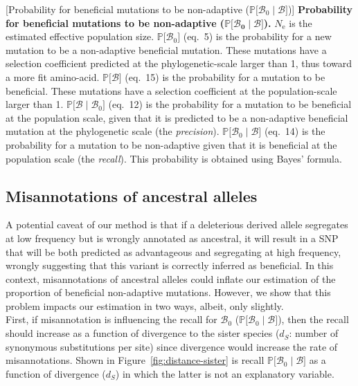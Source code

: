 \documentclass{article}
\newcommand{\Ne}{N_{\text{e}}}
\newcommand{\proba}{\mathbb{P}}
\newcommand{\ds}{d_S}
\newcommand{\SphyBen}{\mathcal{B}_0}
\newcommand{\given}{\mid}
\newcommand{\SpopBen}{\mathcal{B}}
\begin{document}
\begin{center}
\begin{longtable*}{|l|l|r|r|r|r|r|r|}
        \end{longtable*}
        [Probability for beneficial mutations to be non-adaptive ($\proba{[}\SphyBen\given \SpopBen {]}$)]{
        \textbf{Probability for beneficial mutations to be non-adaptive ($\bm{\proba{[}\SphyBen\given \SpopBen {]}}$).}
        $\Ne$ is the estimated effective population size.
        $\proba{[} \SphyBen {]}$ (eq.~5) is the probability for a new mutation to be a non-adaptive beneficial mutation.
        These mutations have a selection coefficient predicted at the phylogenetic-scale larger than 1, thus toward a more fit amino-acid.
        $\proba{[} \SpopBen {]}$ (eq.~15) is the probability for a mutation to be beneficial.
        These mutations have a selection coefficient at the population-scale larger than 1.
        $\proba{[} \SpopBen \given \SphyBen{]}$ (eq.~12) is the probability for a mutation to be beneficial at the population scale, given that it is predicted to be a non-adaptive beneficial mutation at the phylogenetic scale (the \textit{precision}).
        $\proba{[} \SphyBen \given \SpopBen{]}$ (eq.~14) is the probability for a mutation to be non-adaptive given that it is beneficial at the population scale (the \textit{recall}).
        This probability is obtained using Bayes' formula.
        \label{table:proba}
        }
    \end{center}

    \newpage
    \subsection{Misannotations of ancestral alleles}

    A potential caveat of our method is that if a deleterious derived allele segregates at low frequency but is wrongly annotated as ancestral, it will result in a SNP that will be both predicted as advantageous and segregating at high frequency, wrongly suggesting that this variant is correctly inferred as beneficial.
    In this context, misannotations of ancestral alleles could inflate our estimation of the proportion of beneficial non-adaptive mutations.
    However, we show that this problem impacts our estimation in two ways, albeit, only slightly. \\

    First, if misannotation is influencing the recall for $\SphyBen$ ($\proba{[}\SphyBen\given \SpopBen {]}$), then the recall should increase as a function of  divergence to the sister species ($\ds$: number of synonymous substitutions per site) since divergence would increase the rate of misannotations.
    Shown in Figure~\ref{fig:distance-sister} is recall $\proba{[}\SphyBen\given \SpopBen {]}$ as a function of divergence ($\ds$) in which the latter is not an explanatory variable.
\end{document}
